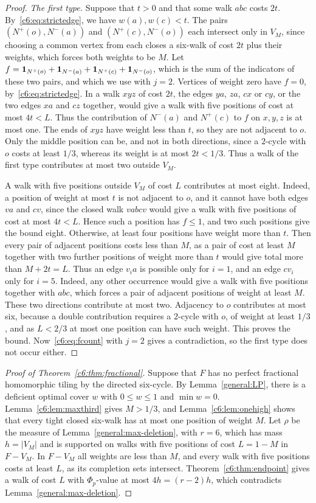 \begin{proof}
\emph{The first type.}
Suppose that $t>0$ and that some walk $abc$ costs $2t$.
By~\eqref{c6:eq:strictedge}, we have $w(a),w(c)<t$. The pairs
$(N^+(o),N^-(a))$ and $(N^+(c),N^-(o))$ each intersect
only in $V_M$, since choosing a common vertex from each closes
a six-walk of cost $2t$ plus their weights, which forces both
weights to be $M$. Let
$f=\mathbf 1_{N^+(o)}+\mathbf 1_{N^-(a)}+\mathbf 1_{N^+(c)}+\mathbf 1_{N^-(o)}$,
which is the sum of the indicators of these two pairs, and which we use with $j=2$.
Vertices of weight zero have $f=0$, by~\eqref{c6:eq:strictedge}. In a walk $xyz$ of cost $2t$, the edges $ya$, $za$, $cx$ or $cy$, or the two edges $xa$ and $cz$ together,
would give a walk with five positions of cost at most $4t<L$. Thus the contribution of $N^-(a)$ and $N^+(c)$ to $f$ on $x,y,z$ is
at most one. The ends of $xyz$ have weight less than $t$, so they are not adjacent to $o$. Only the middle position can be, and not in both
directions, since a $2$-cycle with $o$ costs at least $1/3$,
whereas its weight is at most $2t<1/3$. Thus a walk of the first type contributes at most two outside $V_M$.

A walk with five positions outside $V_M$ of cost $L$ contributes at most eight. Indeed, a position of weight at most $t$ is not adjacent to $o$, and it cannot have both edges $va$ and $cv$, since the closed walk $vabcv$ would give a walk with five positions of cost
at most $4t<L$. Hence such a position has $f\le1$, and two such positions
give the bound eight. Otherwise, at least four positions have weight more than $t$.
Then every pair of adjacent positions costs less than $M$, as a pair
of cost at least $M$ together with two further positions of weight more than $t$
would give total more than $M+2t=L$.
Thus an edge $v_ia$ is possible only for $i=1$, and an edge $cv_i$ only
for $i=5$. Indeed, any other occurrence would give a walk with five positions together with $abc$, which forces a pair of adjacent positions of weight at least $M$.
These two directions contribute at most two. Adjacency
to $o$ contributes at most six, because a double contribution
requires a $2$-cycle with $o$, of weight at least $1/3$, and as $L<2/3$
at most one position can have such weight. This proves the bound.
Now~\eqref{c6:eq:fcount} with $j=2$ gives a contradiction, so the first type does not occur either.
\end{proof}

\begin{proof}[Proof of Theorem~\ref{c6:thm:fractional}]
Suppose that $F$ has no perfect fractional homomorphic tiling by the directed six-cycle. By Lemma~\ref{general:LP}, there is a deficient optimal
cover $w$ with $0\le w\le1$ and $\min w=0$.
Lemma~\ref{c6:lem:maxthird} gives $M>1/3$, and
Lemma~\ref{c6:lem:onehigh} shows that every tight closed six-walk has at most one position of weight $M$.
Let $\rho$ be the measure of Lemma~\ref{general:max-deletion}, with $r=6$, which has mass $h=|V_M|$ and is supported on walks with five positions of cost $L=1-M$ in $F-V_M$.
In $F-V_M$ all weights are less than $M$, and every walk with five positions
costs at least $L$, as its completion sets intersect. Theorem~\ref{c6:thm:endpoint} gives a walk of cost $L$ with $\Phi_p$-value
at most $4h=(r-2)h$, which contradicts Lemma~\ref{general:max-deletion}.
\end{proof}
